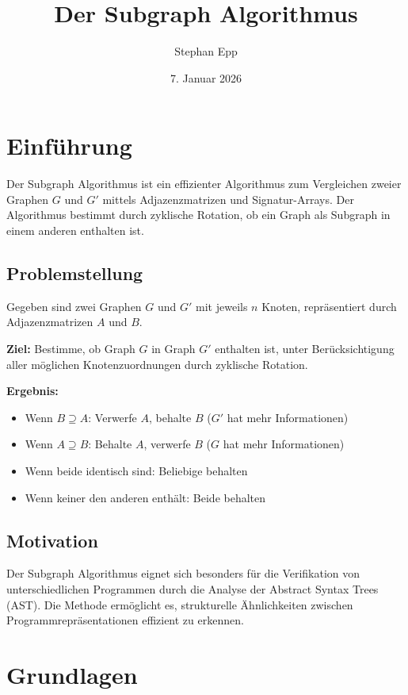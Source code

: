 \documentclass[a4paper,12pt]{article}
\title{Der Subgraph Algorithmus}
\author{Stephan Epp}
\date{7. Januar 2026}
\theoremstyle{definition}
\begin{document}
	
\maketitle

\tableofcontents
\newpage

\section{Einführung}

Der Subgraph Algorithmus ist ein effizienter Algorithmus zum Vergleichen zweier Graphen $G$ und $G'$ mittels Adjazenzmatrizen und Signatur-Arrays. Der Algorithmus bestimmt durch zyklische Rotation, ob ein Graph als Subgraph in einem anderen enthalten ist.

\subsection{Problemstellung}

Gegeben sind zwei Graphen $G$ und $G'$ mit jeweils $n$ Knoten, repräsentiert durch Adjazenzmatrizen $A$ und $B$.

\textbf{Ziel:} Bestimme, ob Graph $G$ in Graph $G'$ enthalten ist, unter Berücksichtigung aller möglichen Knotenzuordnungen durch zyklische Rotation.

\textbf{Ergebnis:}
\begin{itemize}
	\item Wenn $B \supseteq A$: Verwerfe $A$, behalte $B$ ($G'$ hat mehr Informationen)
	\item Wenn $A \supseteq B$: Behalte $A$, verwerfe $B$ ($G$ hat mehr Informationen)
	\item Wenn beide identisch sind: Beliebige behalten
	\item Wenn keiner den anderen enthält: Beide behalten
\end{itemize}

\subsection{Motivation}

Der Subgraph Algorithmus eignet sich besonders für die Verifikation von unterschiedlichen Programmen durch die Analyse der Abstract Syntax Trees (AST). Die Methode ermöglicht es, strukturelle Ähnlichkeiten zwischen Programmrepräsentationen effizient zu erkennen.

\section{Grundlagen}
\end{document}
